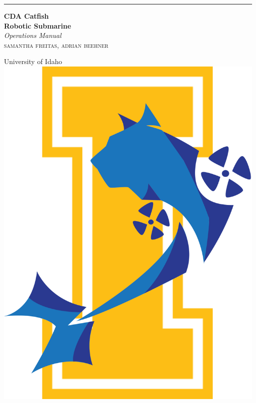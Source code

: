 \documentclass[a4paper, 11pt]{book} %
\begin{document}

\begin{titlepage} %
	
	\raggedleft %
	
	\rule{1pt}{\textheight} %
	\hspace{0.05\textwidth} %
	\parbox[b]{0.75\textwidth}{ %
		
		{\Huge\bfseries CDA Catfish
			 \\[0.5\baselineskip] Robotic Submarine}\\[2\baselineskip] %
		{\large\textit{Operations
		 Manual}}\\[4\baselineskip] %
		{\Large\textsc{samantha freitas, adrian beehner}} %
		
		\vspace{0.5\textheight} %
		
		{\noindent University of Idaho~~
			\includegraphics[width=0.08\linewidth]{Assets/Logos/New_Logov1.png}}\\[\baselineskip] %
	}

\end{titlepage}

\end{document}
